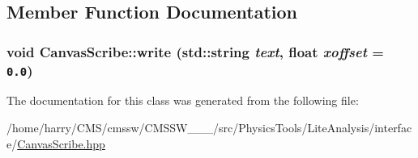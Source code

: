 \subsection{Member Function Documentation}
\hypertarget{classCanvasScribe_a3}{
\subsubsection[write]{\setlength{\rightskip}{0pt plus 5cm}void Canvas\-Scribe::write (std::string {\em text}, float {\em xoffset} = {\tt 0.0})}}
\label{classCanvasScribe_a3}




The documentation for this class was generated from the following file:\begin{CompactItemize}
\item 
/home/harry/CMS/cmssw/CMSSW\_\_\_/src/Physics\-Tools/Lite\-Analysis/interface/\hyperlink{CanvasScribe_8hpp}{Canvas\-Scribe.hpp}\end{CompactItemize}
